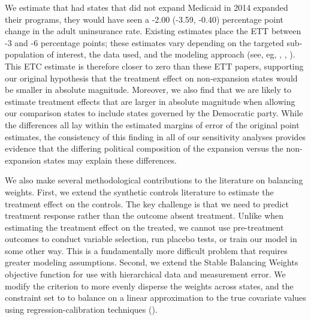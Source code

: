 \documentclass[12pt]{article}
\begin{document}
We estimate that had states that did not expand Medicaid in 2014 expanded their programs, they would have seen a -2.00 (-3.59, -0.40) percentage point change in the adult uninsurance rate. Existing estimates place the ETT between -3 and -6 percentage points; these estimates vary depending on the targeted sub-population of interest, the data used, and the modeling approach (see, eg, \cite{courtemanche2017early}, \cite{kaestner2017effects}, \cite{frean2017premium}). This ETC estimate is therefore closer to zero than these ETT papers, supporting our original hypothesis that the treatment effect on non-expansion states would be smaller in absolute magnitude. Moreover, we also find that we are likely to estimate treatment effects that are larger in absolute magnitude when allowing our comparison states to include states governed by the Democratic party. While the differences all lay within the estimated margins of error of the original point estimates, the consistency of this finding in all of our sensitivity analyses provides evidence that the differing political composition of the expansion versus the non-expansion states may explain these differences. 

We also make several methodological contributions to the literature on balancing weights. First, we extend the synthetic controls literature to estimate the treatment effect on the controls. The key challenge is that we need to predict treatment response rather than the outcome absent treatment. Unlike when estimating the treatment effect on the treated, we cannot use pre-treatment outcomes to conduct variable selection, run placebo tests, or train our model in some other way. This is a fundamentally more difficult problem that requires greater modeling assumptions. Second, we extend the Stable Balancing Weights objective function for use with hierarchical data and measurement error. We modify the criterion to more evenly disperse the weights across states, and the constraint set to to balance on a linear approximation to the true covariate values using regression-calibration techniques (\cite{gleser1992importance}).
\end{document}
